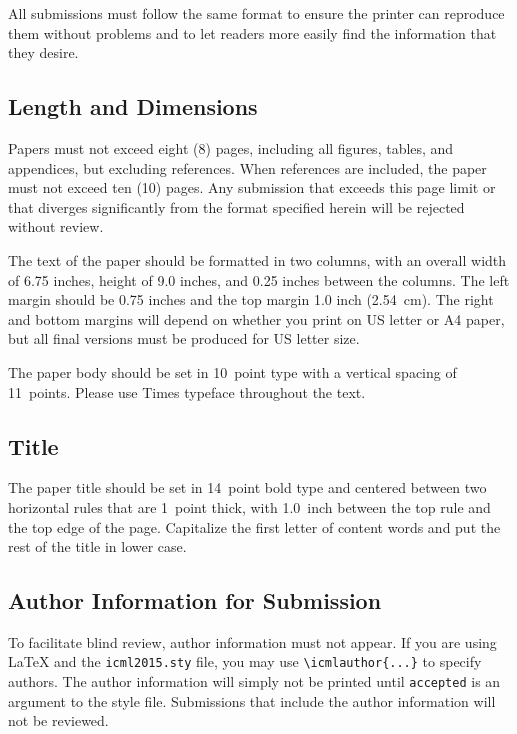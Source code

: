 \documentclass{article}
\begin{document}
All submissions must follow the same format to ensure the printer can
reproduce them without problems and to let readers more easily find
the information that they desire.

\subsection{Length and Dimensions}

Papers must not exceed eight (8) pages, including all figures, tables,
and appendices, but excluding references. When references are included,
the paper must not exceed ten (10) pages. Any submission that exceeds 
this page limit or that diverges significantly from the format specified 
herein will be rejected without review.

The text of the paper should be formatted in two columns, with an
overall width of 6.75 inches, height of 9.0 inches, and 0.25 inches
between the columns. The left margin should be 0.75 inches and the top
margin 1.0 inch (2.54~cm). The right and bottom margins will depend on
whether you print on US letter or A4 paper, but all final versions
must be produced for US letter size.

The paper body should be set in 10~point type with a vertical spacing
of 11~points. Please use Times typeface throughout the text.

\subsection{Title}

The paper title should be set in 14~point bold type and centered
between two horizontal rules that are 1~point thick, with 1.0~inch
between the top rule and the top edge of the page. Capitalize the
first letter of content words and put the rest of the title in lower
case.

\subsection{Author Information for Submission}
\label{author info}

To facilitate blind review, author information must not appear.  If
you are using \LaTeX\/ and the \texttt{icml2015.sty} file, you may use
\verb+\icmlauthor{...}+ to specify authors.  The author information
will simply not be printed until {\tt accepted} is an argument to the
style file. Submissions that include the author information will not
be reviewed.
\end{document}
